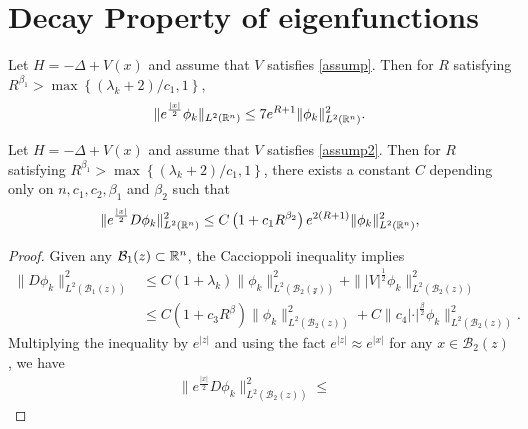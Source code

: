 \iffalse
\section{Decay Property of eigenfunctions}

\begin{lemma}\label{lma3.1}
	Let $H=-\Delta +V(x)$ and assume that $V$ satisfies \cref{assump}. Then for $R$ satisfying $R^{\beta _1}>\max \left\{ \left( \lambda_k+2 \right) /c_1,1\right\} $,
	\begin{equation}
		\|e^{\frac{|x|}{2}}\phi_k\|_{L^2(\mathbb{R}^{n})}\le 7 e^{R+1} \|\phi_k\|_{L^2(\mathbb{R}^{n})}^2.
	\end{equation}
\end{lemma}

\begin{lemma}\label{lma3.2}
	Let $H=-\Delta +V(x)$ and assume that $V$ satisfies \cref{assump2}. Then for $R$ satisfying $R^{\beta _1}> \max \left\{(\lambda_k+2) /c_1,1\right\} $, there exists a constant $C$ depending only on $n,c_1,c_2,\beta_1$ and $\beta _2$ such that
	 \begin{equation}
		\|e^{\frac{|x|}{2}}D\phi_k\|^2_{L^2\left( \mathbb{R}^{n} \right) }\le C\left( 1+c_1 R^{\beta _2} \right)e^{2\left( R+1 \right) } \|\phi_k\|^2_{L^2(\mathbb{R}^{n})},
	\end{equation}
\end{lemma}

\begin{proof}
Given any $\mathcal{B}_{1}(z) \subset \mathbb{R}^{n}$, the Caccioppoli inequality implies
\begin{equation}
	\begin{aligned}
		\|D\phi_k\|^2_{L^2\left( \mathcal{B}_1(z) \right) }&\le C\left( 1+\lambda_k \right) \|\phi_k\|^2_{L^2\left( \mathcal{B_2(z)} \right) }+\| |V|^{\frac{1}{2}}\phi_k\|^2_{L^2\left( \mathcal{B}_2(z) \right) }\\
	&\le C\left( 1+c_3 R^{\beta } \right) \|\phi_k\|^2_{L^2\left( \mathcal{B}_{2}(z) \right) }+C\|c_4|\cdot |^{\frac{\beta}{2}}\phi_k \|^2_{L^2\left( \mathcal{B}_2(z) \right) }. 
	\end{aligned} 
\end{equation}
Multiplying the inequality by $e^{|z|}$ and using the fact $e^{|z|}\approx e^{|x|}$ for any $x\in \mathcal{B}_2(z)$, we have
\begin{equation}
	\begin{aligned}
		\|e^{\frac{|x|}{2}}D\phi_k\|^2_{L^2\left( \mathcal{B}_2(z) \right) }\le & 
	\end{aligned} 
\end{equation}
\end{proof}

